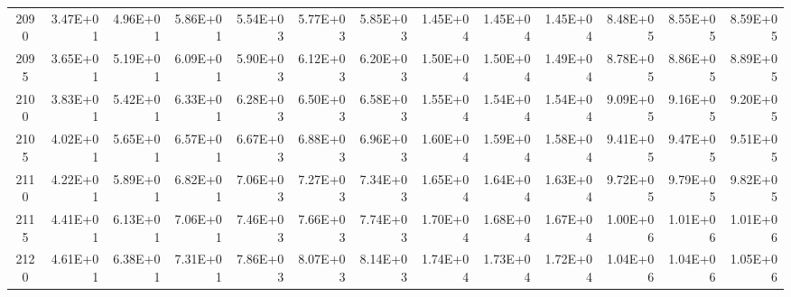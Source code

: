 \documentclass{article}
\begin{document}
\begin{table}
\begin{tabular}{crrr|rrr|rrr|rrr}
2090     & 3.47E+01 & 4.96E+01 & 5.86E+01 & 5.54E+03 & 5.77E+03 & 5.85E+03 & 1.45E+04 & 1.45E+04 & 1.45E+04 & 8.48E+05 & 8.55E+05 & 8.59E+05 \\
2095     & 3.65E+01 & 5.19E+01 & 6.09E+01 & 5.90E+03 & 6.12E+03 & 6.20E+03 & 1.50E+04 & 1.50E+04 & 1.49E+04 & 8.78E+05 & 8.86E+05 & 8.89E+05 \\
2100     & 3.83E+01 & 5.42E+01 & 6.33E+01 & 6.28E+03 & 6.50E+03 & 6.58E+03 & 1.55E+04 & 1.54E+04 & 1.54E+04 & 9.09E+05 & 9.16E+05 & 9.20E+05 \\
2105     & 4.02E+01 & 5.65E+01 & 6.57E+01 & 6.67E+03 & 6.88E+03 & 6.96E+03 & 1.60E+04 & 1.59E+04 & 1.58E+04 & 9.41E+05 & 9.47E+05 & 9.51E+05 \\
2110     & 4.22E+01 & 5.89E+01 & 6.82E+01 & 7.06E+03 & 7.27E+03 & 7.34E+03 & 1.65E+04 & 1.64E+04 & 1.63E+04 & 9.72E+05 & 9.79E+05 & 9.82E+05 \\
2115     & 4.41E+01 & 6.13E+01 & 7.06E+01 & 7.46E+03 & 7.66E+03 & 7.74E+03 & 1.70E+04 & 1.68E+04 & 1.67E+04 & 1.00E+06 & 1.01E+06 & 1.01E+06 \\
2120     & 4.61E+01 & 6.38E+01 & 7.31E+01 & 7.86E+03 & 8.07E+03 & 8.14E+03 & 1.74E+04 & 1.73E+04 & 1.72E+04 & 1.04E+06 & 1.04E+06 & 1.05E+06
\end{tabular}   \end{table}
\clearpage
\end{document}
